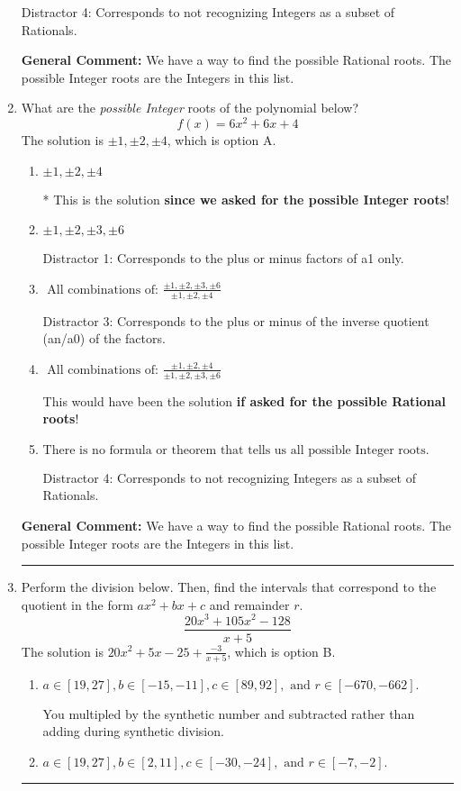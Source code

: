 \documentclass{extbook}[14pt]
\newcommand{\litem}[1]{\item #1

\rule{\textwidth}{0.4pt}}
\begin{document}
\begin{enumerate}
{\begin{enumerate}[label=\Alph*.]
 Distractor 4: Corresponds to not recognizing Integers as a subset of Rationals.
\end{enumerate}

\textbf{General Comment:} We have a way to find the possible Rational roots. The possible Integer roots are the Integers in this list.
}
\litem{
What are the \textit{possible Integer} roots of the polynomial below?
\[ f(x) = 6x^{2} +6 x + 4 \]The solution is \( \pm 1,\pm 2,\pm 4 \), which is option A.\begin{enumerate}[label=\Alph*.]
\item \( \pm 1,\pm 2,\pm 4 \)

* This is the solution \textbf{since we asked for the possible Integer roots}!
\item \( \pm 1,\pm 2,\pm 3,\pm 6 \)

 Distractor 1: Corresponds to the plus or minus factors of a1 only.
\item \( \text{ All combinations of: }\frac{\pm 1,\pm 2,\pm 3,\pm 6}{\pm 1,\pm 2,\pm 4} \)

 Distractor 3: Corresponds to the plus or minus of the inverse quotient (an/a0) of the factors. 
\item \( \text{ All combinations of: }\frac{\pm 1,\pm 2,\pm 4}{\pm 1,\pm 2,\pm 3,\pm 6} \)

This would have been the solution \textbf{if asked for the possible Rational roots}!
\item \( \text{There is no formula or theorem that tells us all possible Integer roots.} \)

 Distractor 4: Corresponds to not recognizing Integers as a subset of Rationals.
\end{enumerate}

\textbf{General Comment:} We have a way to find the possible Rational roots. The possible Integer roots are the Integers in this list.
}
\litem{
Perform the division below. Then, find the intervals that correspond to the quotient in the form $ax^2+bx+c$ and remainder $r$.
\[ \frac{20x^{3} +105 x^{2} -128}{x + 5} \]The solution is \( 20x^{2} +5 x -25 + \frac{-3}{x + 5} \), which is option B.\begin{enumerate}[label=\Alph*.]
\item \( a \in [19, 27], b \in [-15, -11], c \in [89, 92], \text{ and } r \in [-670, -662]. \)

 You multipled by the synthetic number and subtracted rather than adding during synthetic division.
\item \( a \in [19, 27], b \in [2, 11], c \in [-30, -24], \text{ and } r \in [-7, -2]. \)


\end{enumerate}}
\end{enumerate}
\end{document}
